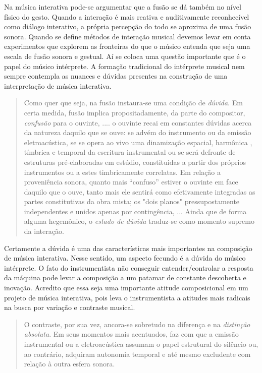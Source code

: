 \documentclass{ppgmus}
\begin{document}
Na música interativa pode-se argumentar que a fusão se dá também no nível
físico do gesto. Quando a interação é mais reativa e auditivamente reconhecível
como diálogo interativo, a própria percepção do todo se aproxima de uma
fusão sonora. Quando se define métodos de interação musical devemos levar
em conta experimentos que explorem as fronteiras do que o músico entenda
que seja uma escala de fusão sonora e gestual. Aí se coloca uma questão
importante que é o papel do músico intérprete. A formação tradicional
do intérprete musical nem sempre contempla as nuances e dúvidas presentes na construção
de uma interpretação de música interativa. 

\begin{quote}
Como quer que seja, na fusão instaura-se uma condição de \textit{dúvida}.
Em certa medida, fusão implica propositadamente, da parte do compositor,
\textit{confusão} para o ouvinte,
....
o ouvinte recai em constantes dúvidas
acerca da natureza daquilo que se ouve: se advém do instrumento ou da 
emissão eletroacústica, se se opera ao vivo uma dinamização espacial, harmônica
, tímbrica e temporal da escritura instrumental ou se será defronte de
estruturas pré-elaboradas em estúdio, constituidas a partir dos próprios
instrumentos ou a estes timbricamente correlatas. Em relação a proveniência
sonora, quanto mais ``confuso'' estiver o ouvinte em face daquilo que
o ouve, tanto mais ele sentirá como efetivamente integradas as partes
constitutivas da obra mista; os "dois planos" pressupostamente independentes
e unidos apenas por contingência,
... 
Ainda que de forma alguma hegemônico, o \textit{estado de
dúvida} traduz-se como momento supremo da interação. \cite{menezes2006musica}
\end{quote}

Certamente a dúvida é uma das características mais importantes na composição
de música interativa. Nesse sentido, um aspecto fecundo é a dúvida do músico
intérprete. O fato do instrumentista não conseguir entender/controlar a resposta
da máquina pode levar a composição a um patamar de constante descoberta e inovação.
Acredito que essa seja uma importante atitude composicional em um projeto de 
música interativa, pois leva o instrumentista a atitudes mais radicais na 
busca por variação e contraste musical.

\begin{quote}
O contraste, por sua vez, ancora-se sobretudo na diferença e na 
\textit{distinção absoluta}. Em seus momentos mais acentuados, faz com
que a emissão instrumental ou a eletroacústica assumam o papel estrutural
do silêncio ou, ao contrário, adquiram autonomia temporal e até mesmo
excludente com relação à outra esfera sonora. \cite{menezes2006musica}
\end{quote}
\end{document}
